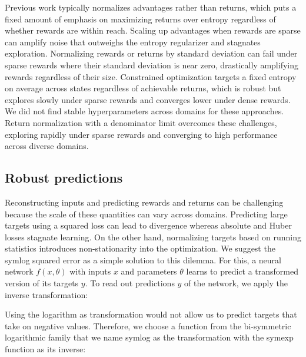 
Previous work typically normalizes advantages\citep{schulman2017ppo} rather than returns, which puts a fixed amount of emphasis on maximizing returns over entropy regardless of whether rewards are within reach.
Scaling up advantages when rewards are sparse can amplify noise that outweighs the entropy regularizer and stagnates exploration.
Normalizing rewards or returns by standard deviation can fail under sparse rewards where their standard deviation is near zero, drastically amplifying rewards regardless of their size.
Constrained optimization targets a fixed entropy on average across states \citep{haarnoja2018sac,abdolmaleki2018mpo} regardless of achievable returns, which is robust but explores slowly under sparse rewards and converges lower under dense rewards.
We did not find stable hyperparameters across domains for these approaches.
Return normalization with a denominator limit overcomes these challenges, exploring rapidly under sparse rewards and converging to high performance across diverse domains.

\subsection*{Robust predictions}
\label{sec:symlog}

Reconstructing inputs and predicting rewards and returns can be challenging because the scale of these quantities can vary across domains.
Predicting large targets using a squared loss can lead to divergence whereas absolute and Huber losses \citep{mnih2015dqn} stagnate learning.
On the other hand, normalizing targets based on running statistics \citep{schulman2017ppo} introduces non-stationarity into the optimization.
We suggest the symlog squared error as a simple solution to this dilemma.
For this, a neural network $f(x,\theta)$ with inputs $x$ and parameters $\theta$ learns to predict a transformed version of its targets $y$.
To read out predictions $\hat{y}$ of the network, we apply the inverse transformation:


Using the logarithm as transformation would not allow us to predict targets that take on negative values.
Therefore, we choose a function from the bi-symmetric logarithmic family \citep{webber2012symlog} that we name symlog as the transformation with the symexp function as its inverse:

